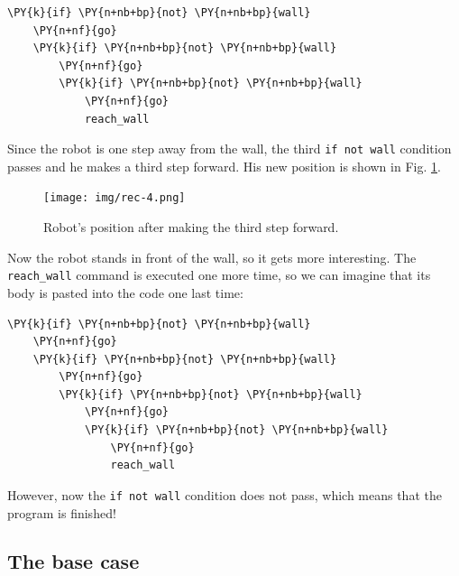 \begin{bbox}
\begin{Verbatim}[commandchars=\\\{\}]
\PY{k}{if} \PY{n+nb+bp}{not} \PY{n+nb+bp}{wall}
    \PY{n+nf}{go}
    \PY{k}{if} \PY{n+nb+bp}{not} \PY{n+nb+bp}{wall}
        \PY{n+nf}{go}
        \PY{k}{if} \PY{n+nb+bp}{not} \PY{n+nb+bp}{wall}
            \PY{n+nf}{go}
            reach_wall
\end{Verbatim}
\end{bbox}
\vspace{6mm}

\noindent
Since the robot is one step away from the wall, the third {\tt if not wall} condition passes and 
he makes a third step forward. His new position is shown in Fig. \ref{fig:rec4}.
\newpage

\begin{figure}[!ht]
\begin{center}
\texttt{[image: img/rec-4.png]}
\end{center}
\vspace{-4mm}
\caption{Robot's position after making the third step forward.}
\label{fig:rec4}
\end{figure}
\noindent
Now the robot stands in front of the wall, so it gets more interesting. The 
{\tt reach\_wall} command is executed one more time, so we can imagine that its body 
is pasted into the code one last time:\\

\begin{bbox}
\begin{Verbatim}[commandchars=\\\{\}]
\PY{k}{if} \PY{n+nb+bp}{not} \PY{n+nb+bp}{wall}
    \PY{n+nf}{go}
    \PY{k}{if} \PY{n+nb+bp}{not} \PY{n+nb+bp}{wall}
        \PY{n+nf}{go}
        \PY{k}{if} \PY{n+nb+bp}{not} \PY{n+nb+bp}{wall}
            \PY{n+nf}{go}
            \PY{k}{if} \PY{n+nb+bp}{not} \PY{n+nb+bp}{wall}
                \PY{n+nf}{go}
                reach_wall
\end{Verbatim}
\end{bbox}
\vspace{6mm}

\noindent
However, now the {\tt if not wall} condition does not pass, which means that  
the program is finished!

\subsection[\ \ The base case]{The base case}

